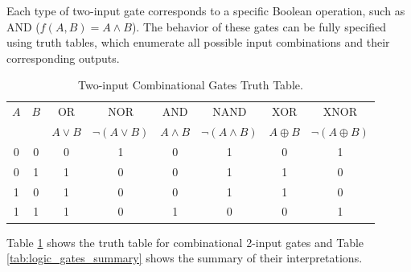 Each type of two-input gate corresponds to a specific Boolean operation, such as AND (\( f(A, B) = A \land B \)). The behavior of these gates can be fully specified using truth tables, which enumerate all possible input combinations and their corresponding outputs.

\begin{table}[H]
  \begin{center}
    \caption{Two-input Combinational Gates Truth Table.}
    \label{tab:two_input_gates}
    \begin{tabular}{|c|c||c|c|c|c|c|c|}
      \hline
      $A$& $B$&   OR&        NOR&              AND&     NAND&              XOR&         XNOR \\ 
       &  &  $A\lor B$ & $\neg (A \lor B)$& $A\land B$& $\neg (A \land B)$&  $A\oplus B$&   $\neg (A \oplus B)$                              \\ \hline \hline
      0& 0&  0&         1&                 0&       1&                  0&           1\\ \hline
      0& 1&  1&         0&                 0&       1&                  1&           0\\ \hline
      1& 0&  1&         0&                 0&       1&                  1&           0\\ \hline
      1& 1&  1&         0&                 1&       0&                  0&           1\\ \hline
    \end{tabular}
  \end{center}
\end{table}

Table \ref{tab:two_input_gates} shows the truth table for combinational 2-input gates and Table \ref{tab:logic_gates_summary} shows the summary of their interpretations.

